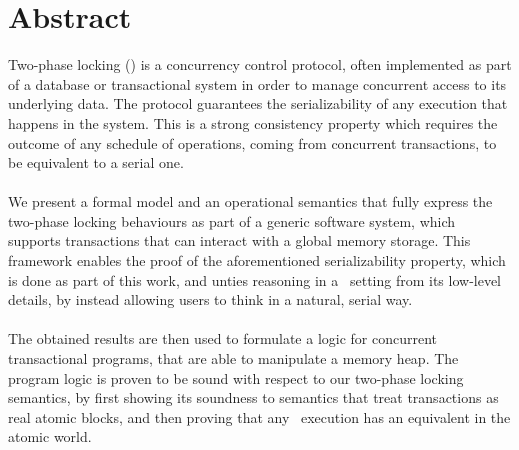 \vspace*{\fill}
\section*{Abstract}

Two-phase locking (\tpl) is a concurrency control protocol, often implemented as part of a database or transactional system in order to manage concurrent access to its underlying data. The protocol guarantees the serializability of any execution that happens in the system. This is a strong consistency property which requires the outcome of any schedule of operations, coming from concurrent transactions, to be equivalent to a serial one. \\ \\
We present a formal model and an operational semantics that fully express the two-phase locking behaviours as part of a generic software system, which supports transactions that can interact with a global memory storage. This framework enables the proof of the aforementioned serializability property, which is done as part of this work, and unties  reasoning in a \tpl\ setting from its low-level details, by instead allowing users to think in a natural, serial way. \\ \\
The obtained results are then used to formulate a logic for concurrent transactional programs, that are able to manipulate a memory heap. The program logic is proven to be sound with respect to our two-phase locking semantics, by first showing its soundness to semantics that treat transactions as real atomic blocks, and then proving that any \tpl\ execution has an equivalent in the atomic world.
\vspace*{\fill}
